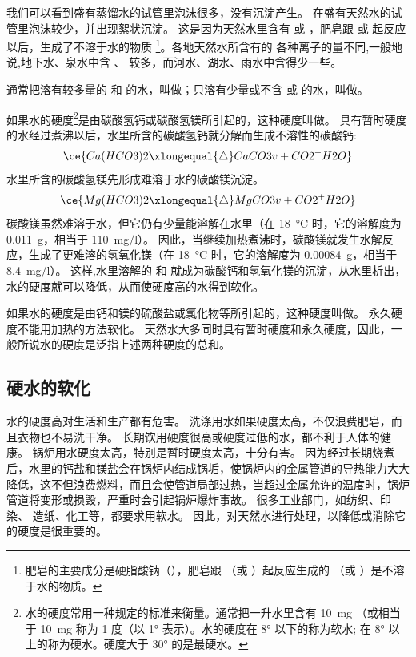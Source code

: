 我们可以看到盛有蒸馏水的试管里泡沫很多，没有沉淀产生。
在盛有天然水的试管里泡沫较少，并出现絮状沉淀。
这是因为天然水里含有  或 ，肥皂跟  或  起反应以后，生成了不溶于水的物质 \footnote{肥皂的主要成分是硬脂酸钠（），肥皂跟 （或 ）起反应生成的 （或 ）是不溶于水的物质。}。各地天然水所含有的 各种离子的量不同,一般地说,地下水、泉水中含 、 较多，而河水、湖水、雨水中含得少一些。

通常把溶有较多量的  和  的水，叫做；只溶有少量或不含  或  的水，叫做。

如果水的硬度\footnote{水的硬度常用一种规定的标准来衡量。通常把一升水里含有 \qty{10}{mg} （或相当于 \qty{10}{mg}  称为 1 度（以 \ang{1} 表示）。水的硬度在 \ang{8} 以下的称为软水; 在 \ang{8} 以上的称为硬水。硬度大于 \ang{30} 的是最硬水。}是由碳酸氢钙或碳酸氢镁所引起的，这种硬度叫做。
具有暂时硬度的水经过煮沸以后，水里所含的碳酸氢钙就分解而生成不溶性的碳酸钙:
\[ \ce{Ca(HCO3)2 \xlongequal{\triangle} CaCO3 v + CO2 ^ + H2O} \]
水里所含的碳酸氢镁先形成难溶于水的碳酸镁沉淀。
\[ \ce{Mg(HCO3)2 \xlongequal{\triangle} MgCO3 v + CO2 ^ + H2O} \]
碳酸镁虽然难溶于水，但它仍有少量能溶解在水里（在 \qty{18}{\celsius} 时，它的溶解度为 \qty{0.011}{g}，相当于 \qty{110}{mg/l}）。
因此，当继续加热煮沸时，碳酸镁就发生水解反应，生成了更难溶的氢氧化镁（在 \qty{18}{\celsius} 时，它的溶解度为 \qty{0.00084}{g}，相当于 \qty{8.4}{mg/l}）。
这样,水里溶解的  和  就成为碳酸钙和氢氧化镁的沉淀，从水里析出，水的硬度就可以降低，从而使硬度高的水得到软化。

如果水的硬度是由钙和镁的硫酸盐或氯化物等所引起的，这种硬度叫做。
永久硬度不能用加热的方法软化。
天然水大多同时具有暂时硬度和永久硬度，因此，一般所说水的硬度是泛指上述两种硬度的总和。


\subsection{硬水的软化}
水的硬度高对生活和生产都有危害。
洗涤用水如果硬度太高，不仅浪费肥皂，而且衣物也不易洗干净。
长期饮用硬度很高或硬度过低的水，都不利于人体的健康。
锅炉用水硬度太高，特别是暂时硬度太高，十分有害。
因为经过长期烧煮后，水里的钙盐和镁盐会在锅炉内结成锅垢，使锅炉内的金属管道的导热能力大大降低，这不但浪费燃料，而且会使管道局部过热，当超过金属允许的温度时，锅炉管道将变形或损毁，严重时会引起锅炉爆炸事故。
很多工业部门，如纺织、印染、 造纸、化工等，都要求用软水。
因此，对天然水进行处理，以降低或消除它的硬度是很重要的。

